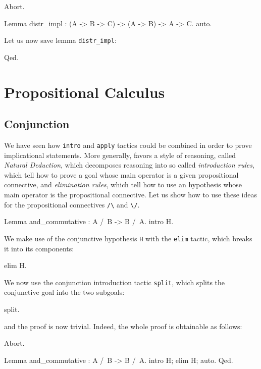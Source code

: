 \documentclass[11pt,a4paper]{book}
\begin{document}
\begin{coq_eval}
Abort.
\end{coq_eval}
\begin{coq_example}
Lemma distr_impl : (A -> B -> C) -> (A -> B) -> A -> C.
auto.
\end{coq_example}

Let us now save lemma \verb:distr_impl::
\begin{coq_example}
Qed.
\end{coq_example}

\section{Propositional Calculus}

\subsection{Conjunction}

We have seen how \verb:intro: and \verb:apply: tactics could be combined
in order to prove implicational statements. More generally, \Coq{} favors a style
of reasoning, called {\sl Natural Deduction}, which decomposes reasoning into
so called {\sl introduction rules}, which tell how to prove a goal whose main
operator is a given propositional connective, and {\sl elimination rules},
which tell how to use an hypothesis whose main operator is the propositional
connective. Let us show how to use these ideas for the propositional connectives
\verb:/\: and \verb:\/:.

\begin{coq_example}
Lemma and_commutative : A /\ B -> B /\ A.
intro H.
\end{coq_example}

We make use of the conjunctive hypothesis \verb:H: with the \verb:elim: tactic,
which breaks it into its components:
\begin{coq_example}
elim H.
\end{coq_example}

We now use the conjunction introduction tactic \verb:split:, which splits the
conjunctive goal into the two subgoals:
\begin{coq_example}
split.
\end{coq_example}
and the proof is now trivial. Indeed, the whole proof is obtainable as follows:
\begin{coq_eval}
Abort.
\end{coq_eval}
\begin{coq_example}
Lemma and_commutative : A /\ B -> B /\ A.
intro H; elim H; auto.
Qed.
\end{coq_example}
\end{document}
